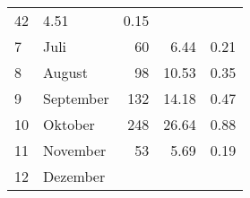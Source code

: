 \begin{longtable}{lXrrr}
       \num{42} &
       \num[round-mode=places,round-precision=2]{4.51} &
         \num[round-mode=places,round-precision=2]{0.15} \\

     7 &
     \multicolumn{1}{X}{ Juli   } &


       \num{60} &
       \num[round-mode=places,round-precision=2]{6.44} &
         \num[round-mode=places,round-precision=2]{0.21} \\

     8 &
     \multicolumn{1}{X}{ August   } &


       \num{98} &
       \num[round-mode=places,round-precision=2]{10.53} &
         \num[round-mode=places,round-precision=2]{0.35} \\

     9 &
     \multicolumn{1}{X}{ September   } &


       \num{132} &
       \num[round-mode=places,round-precision=2]{14.18} &
         \num[round-mode=places,round-precision=2]{0.47} \\

     10 &
     \multicolumn{1}{X}{ Oktober   } &


       \num{248} &
       \num[round-mode=places,round-precision=2]{26.64} &
         \num[round-mode=places,round-precision=2]{0.88} \\

     11 &
     \multicolumn{1}{X}{ November   } &


       \num{53} &
       \num[round-mode=places,round-precision=2]{5.69} &
         \num[round-mode=places,round-precision=2]{0.19} \\

     12 &
     \multicolumn{1}{X}{ Dezember   } &



\end{longtable}

